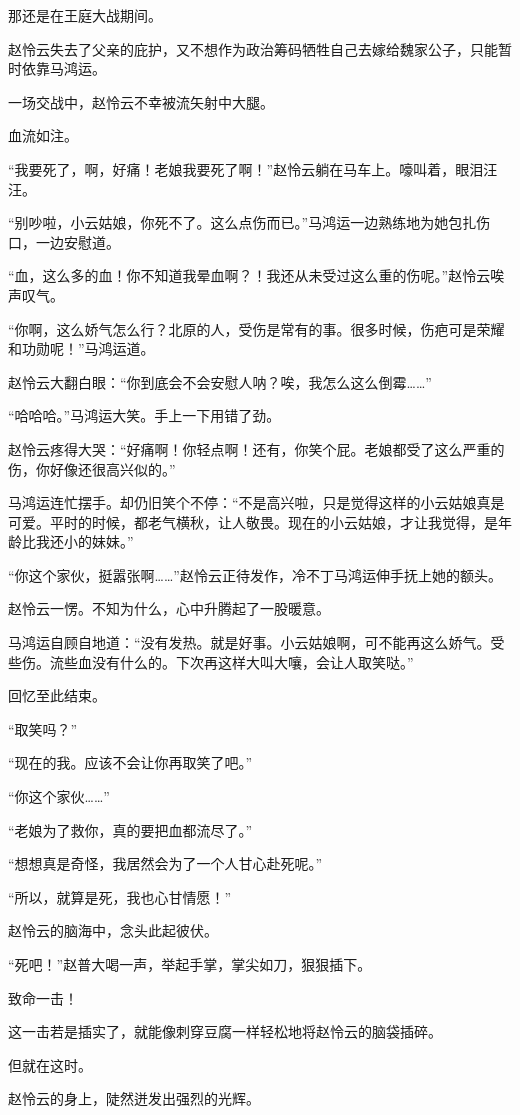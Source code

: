 \begin{this_body}
那还是在王庭大战期间。

赵怜云失去了父亲的庇护，又不想作为政治筹码牺牲自己去嫁给魏家公子，只能暂时依靠马鸿运。

一场交战中，赵怜云不幸被流矢射中大腿。

血流如注。

“我要死了，啊，好痛！老娘我要死了啊！”赵怜云躺在马车上。嚎叫着，眼泪汪汪。

“别吵啦，小云姑娘，你死不了。这么点伤而已。”马鸿运一边熟练地为她包扎伤口，一边安慰道。

“血，这么多的血！你不知道我晕血啊？！我还从未受过这么重的伤呢。”赵怜云唉声叹气。

“你啊，这么娇气怎么行？北原的人，受伤是常有的事。很多时候，伤疤可是荣耀和功勋呢！”马鸿运道。

赵怜云大翻白眼：“你到底会不会安慰人呐？唉，我怎么这么倒霉……”

“哈哈哈。”马鸿运大笑。手上一下用错了劲。

赵怜云疼得大哭：“好痛啊！你轻点啊！还有，你笑个屁。老娘都受了这么严重的伤，你好像还很高兴似的。”

马鸿运连忙摆手。却仍旧笑个不停：“不是高兴啦，只是觉得这样的小云姑娘真是可爱。平时的时候，都老气横秋，让人敬畏。现在的小云姑娘，才让我觉得，是年龄比我还小的妹妹。”

“你这个家伙，挺嚣张啊……”赵怜云正待发作，冷不丁马鸿运伸手抚上她的额头。

赵怜云一愣。不知为什么，心中升腾起了一股暖意。

马鸿运自顾自地道：“没有发热。就是好事。小云姑娘啊，可不能再这么娇气。受些伤。流些血没有什么的。下次再这样大叫大嚷，会让人取笑哒。”

回忆至此结束。

“取笑吗？”

“现在的我。应该不会让你再取笑了吧。”

“你这个家伙……”

“老娘为了救你，真的要把血都流尽了。”

“想想真是奇怪，我居然会为了一个人甘心赴死呢。”

“所以，就算是死，我也心甘情愿！”

赵怜云的脑海中，念头此起彼伏。

“死吧！”赵普大喝一声，举起手掌，掌尖如刀，狠狠插下。

致命一击！

这一击若是插实了，就能像刺穿豆腐一样轻松地将赵怜云的脑袋插碎。

但就在这时。

赵怜云的身上，陡然迸发出强烈的光辉。


\end{this_body}
